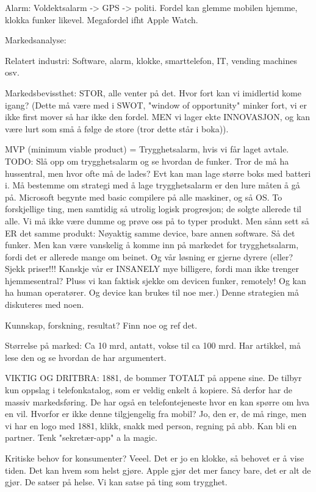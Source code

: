 Alarm: Voldektsalarm -> GPS -> politi. Fordel kan glemme mobilen hjemme, klokka
funker likevel. Megafordel ifht Apple Watch.


Markedsanalyse:

Relatert industri: Software, alarm, klokke, smarttelefon, IT, vending machines
osv.

Markedsbevissthet: STOR, alle venter på det. Hvor fort kan vi imidlertid kome
igang? (Dette må være med i SWOT, "window of opportunity" minker fort, vi er
ikke first mover så har ikke den fordel. MEN vi lager ekte INNOVASJON, og kan
være lurt som små å følge de store (tror dette står i boka)).

MVP (minimum viable product) = Trygghetsalarm, hvis vi får laget avtale. TODO:
Slå opp om trygghetsalarm og se hvordan de funker. Tror de må ha hussentral,
men hvor ofte må de lades? Evt kan man lage større boks med batteri i.
Må bestemme om strategi med å lage trygghetsalarm er den lure måten å gå på.
Microsoft begynte med basic compilere på alle maskiner, og så OS. To
forskjellige ting, men samtidig så utrolig logisk progresjon; de solgte
allerede til alle. Vi må ikke være dumme og prøve oss på to typer produkt.
Men sånn sett så ER det samme produkt: Nøyaktig samme device, bare annen
software. Så det funker. Men kan være vanskelig å komme inn på markedet for
trygghetsalarm, fordi det er allerede mange om beinet. Og vår løsning er gjerne
dyrere (eller? Sjekk priser!!! Kanskje vår er INSANELY mye billigere, fordi man
ikke trenger hjemmesentral? Pluss vi kan faktisk sjekke om devicen funker,
remotely! Og kan ha human operatører. Og device kan brukes til noe mer.) Denne
strategien må diskuteres med noen.

Kunnskap, forskning, resultat? Finn noe og ref det.

Størrelse på marked: Ca 10 mrd, antatt, vokse til ca 100 mrd. Har artikkel,
må lese den og se hvordan de har argumentert.

VIKTIG OG DRITBRA: 1881, de bommer TOTALT på appene sine. De tilbyr kun oppslag
i telefonkatalog, som er veldig enkelt å kopiere. Så derfor har de massiv
markedsføring. De har også en telefontejeneste hvor en kan spørre om hva en
vil. Hvorfor er ikke denne tilgjengelig fra mobil? Jo, den er, de må ringe, men
vi har en logo med 1881, klikk, snakk med person, regning på abb. Kan bli en
partner. Tenk "sekretær-app" a la magic.

Kritiske behov for konsumenter? Veeel. Det er jo en klokke, så behovet er å
vise tiden. Det kan hvem som helst gjøre. Apple gjør det mer fancy bare, det er
alt de gjør. De satser på helse. Vi kan satse på ting som trygghet.

